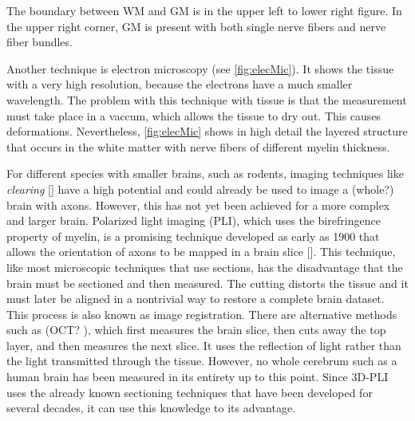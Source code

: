 The boundary between \ac{WM} and \ac{GM} is in the upper left to lower right figure.
In the upper right corner, \ac{GM} is present with both single nerve fibers and nerve fiber bundles.
\par
%
Another technique is electron microscopy (see \cref{fig:elecMic}).
It shows the tissue with a very high resolution, because the electrons have a much smaller wavelength.
The problem with this technique with tissue is that the measurement must take place in a vaccum, which allows the tissue to dry out.
This causes deformations.
Nevertheless, \cref{fig:elecMic} shows in high detail the layered structure that occurs in the white matter with nerve fibers of different myelin thickness.
\par
%
For different species with smaller brains, such as rodents, imaging techniques like \textit{clearing} [\dummy{}] have a high potential and could already be used to image a (whole?) brain with axons.
However, this has not yet been achieved for a more complex and larger brain.
Polarized light imaging (PLI), which uses the birefringence property of myelin, is a promising technique developed as early as 1900 that allows the orientation of axons to be mapped in a brain slice [\dummy{}].
This technique, like most microscopic techniques that use sections, has the disadvantage that the brain must be sectioned and then measured.
The cutting distorts the tissue and it must later be aligned in a nontrivial way to restore a complete brain dataset.
This process is also known as image registration.
There are alternative methods such as (OCT? \cite{Aumann2019}), which first measures the brain slice, then cuts away the top layer, and then measures the next slice. It uses the reflection of light rather than the light transmitted through the tissue.
However, no whole cerebrum such as a human brain has been measured in its entirety up to this point.
Since \ac{3D-PLI} uses the already known sectioning techniques that have been developed for several decades, it can use this knowledge to its advantage.
%
%
